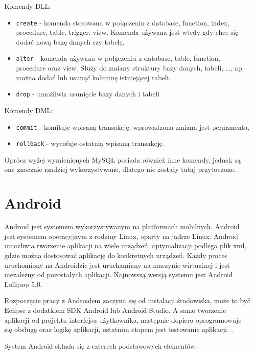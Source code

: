 \documentclass[eng,printmode,oneside]{mgr}
\begin{document}
Komendy DLL:
\begin{itemize}
  \item \texttt{create} - komenda stosowana w połączeniu z database, function,
  index, procedure, table, trigger, view. Komenda używana jest wtedy gdy chce
  się dodać nową bazę danych czy tabelę. 
  \item \texttt{alter} - komenda używana w połączeniu z database, table,
  function, procedure oraz view. Służy do zmiany struktury bazy danych, tabeli,
  \ldots, np można dodać lub usunąć kolumnę istniejącej tabeli.
  \item \texttt{drop} - umożliwia usunięcie bazy danych i tabeli
\end{itemize}
Komendy DML:
\begin{itemize}
  \item \texttt{commit} - komituje wpisaną transakcję, wprowadzona zmiana jest
  pernamenta,
  \item \texttt{rollback} - wycofuje ostatnią wpisaną transakcję.
\end{itemize}

Oprócz wyżej wymienionych MySQL posiada również inne komendy, jednak są one
znacznie rzadziej wykorzystywane, dlatego nie zostały tutaj przytoczone.

\section{Android}

Android jest systemem wykorzystywanym na platformach mobilnych. Android
jest systemem operacyjnym z rodziny Linux, oparty na jądrze Linux. Android
umożliwia tworzenie aplikacji na wiele urządzeń, optymalizacji podlega plik xml,
gdzie można dostosować aplikację do konkretnych urządzeń. Każdy proces
uruchomiony na Androidzie jest uruchamiany na maszynie wirtualnej i jest
niezależny od pozostałych aplikacji. Najnowszą wersją systemu jest Android
Lollipop 5.0.

Rozpoczęcie pracy z Androidem zaczyna się od instalacji środowiska, może to być
Eclipse z dodatkiem SDK Android lub Android Studio. A samo tworzenie aplikacji
od projektu interfejsu użytkownika, następnie dopiero oprogramowuje się obsługę
oraz logikę aplikacji, ostatnim etapem jest testowanie aplikacji.
\cite{developer.android}. 

System Android składa się z czterech podstawowych elementów. 
\end{document}
